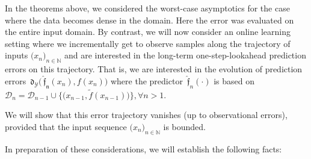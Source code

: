 \documentclass{article} %
\theoremstyle{definition}
\theoremstyle{remark}
\newcommand{\nat}{\mathbb N}
\newcommand{\vc}[1]{#1}
\newcommand{\data}{\ensuremath{ \mathcal D} }
\newcommand{\state}{\ensuremath{ \vc x}} %
\newcommand{\outspace}{\ensuremath{ \mathcal Y}}
\newcommand{\metric}{\, \mathfrak{d}} %
\newcommand{\Metrico}[2]{\metric_\outspace\bigl(#1,#2\bigr) }
\newcommand{\predf}{\, \mathfrak{  \hat f}} %
\newcommand{\predfn}{\, \mathfrak{  \hat f_n}} %
\newcommand{\seq}[2]{\ensuremath{\bigl(#1\bigr)_{#2}}}
\begin{document}
In the theorems above, we considered the worst-case asymptotics for the case where the data becomes dense in the domain. Here the error was evaluated on the entire input domain. By contrast, we will now consider an online learning setting where we incrementally get to observe samples along the trajectory of inputs $\seq{x_n}{n \in \nat }$ and are interested in the long-term one-step-lookahead prediction errors on this trajectory.
That is, we are interested in the evolution of prediction errors $\Metrico{\predfn(x_n)}{f(x_n) }$
where the predictor $\predf_{n}(\cdot)$ is based on $\data_{n} = \data_{n-1} \cup \{ \bigl(\state_{n-1}, \tilde f(\state_{n-1}) \bigr)\}, \forall n >1 $. 

We will show that this error trajectory vanishes (up to observational errors), provided that the input sequence $\seq{x_n}{n \in \nat}$ is bounded.

In preparation of these considerations, we will establish the following facts:
\end{document}
